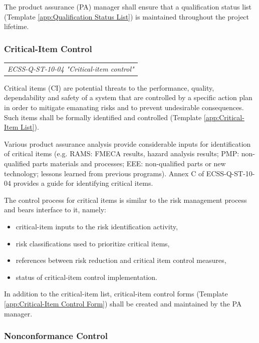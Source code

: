The product assurance (PA) manager shall ensure that a qualification status list (Template \ref{app:Qualification Status List}) is maintained throughout the project lifetime.

\subsubsection{Critical-Item Control}
\label{sec:Critical-Item Control}

\begin{tabular}{l}
\textit{ECSS-Q-ST-10-04 "Critical-item control" \cite{ECSS-Q-ST-10-04}}
\end{tabular}

Critical items (CI) are potential threats to the performance, quality, dependability and safety of a system that are controlled by a specific action plan in order to mitigate emanating risks and to prevent undesirable consequences. Such items shall be formally identified and controlled (Template \ref{app:Critical-Item List}). 

Various product assurance analysis provide considerable inputs for identification of critical items (e.g. RAMS: FMECA results, hazard analysis results; PMP: non-qualified parts materials and processes; EEE: non-qualified parts or new technology; lessons learned from previous programs). Annex C of ECSS-Q-ST-10-04 provides a guide for identifying critical items.

The control process for critical items is similar to the risk management process and bears interface to it, namely:

\begin{itemize}
\item critical-item inputs to the risk identification activity, 
\item risk classifications used to prioritize critical items, 
\item references between risk reduction and critical item control measures, 
\item status of critical-item control implementation. 
\end{itemize}

In addition to the critical-item list, critical-item control forms (Template \ref{app:Critical-Item Control Form}) shall be created and maintained by the PA manager.

\subsubsection{Nonconformance Control}
\label{sec:Nonconformance Control}

